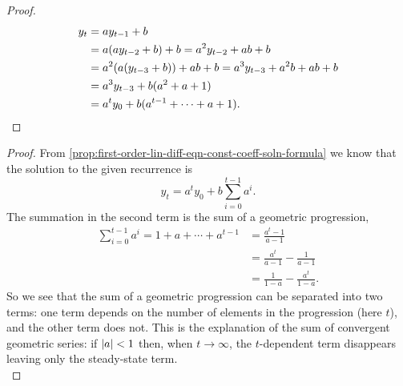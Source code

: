 \documentclass[../MathsNotesBase.tex]{subfiles}
\begin{document}
{		\bigskip\medskip
		\begin{proof}
			\begin{align*}
			y_t &= a y_{t-1} + b \\
			&= a(a y_{t-2} + b) + b = a^2 y_{t-2} + ab + b\\
			&= a^2 (a(y_{t-3} + b)) + ab + b = a^3 y_{t-3} + a^2 b + ab + b \\
			&= a^3 y_{t-3} + b(a^2 + a + 1) \\
			&= a^t y_0 + b(a^{t-1} + \cdots + a + 1).  \qedhere  
			\end{align*}
		\end{proof}
	
		\bigskip\medskip
		\begin{proof}
			From \autoref{prop:first-order-lin-diff-eqn-const-coeff-soln-formula} we know that the solution to the given recurrence is
			\[ y_t = a^t y_0 + b \sum_{i=0}^{t-1} a^i. \]
			The summation in the second term is the sum of a geometric progression,
			\begin{align*}
			\sum_{i=0}^{t-1} a^i = 1 + a + \cdots + a^{t-1} &= \frac{a^t - 1}{a - 1} \\[8pt]
			&= \frac{a^t}{a - 1} - \frac{1}{a - 1} \\[8pt]
			&= \frac{1}{1 - a} - \frac{a^t}{1 - a}.
			\end{align*}
			So we see that the sum of a geometric progression can be separated into two terms: one term depends on the number of elements in the progression (here $t$), and the other term does not. This is the explanation of the sum of convergent geometric series: if ${ \left\lvert a\right\rvert < 1 }$ then, when ${ t \to \infty }$, the $t$-dependent term disappears leaving only the steady-state term.\\
			

\end{proof}}
\end{document}
